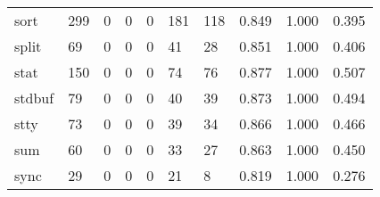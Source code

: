 \begin{longtable}{lp{1.3cm}p{1.3cm}p{1.3cm}p{1.3cm}p{1.3cm}p{1.3cm}p{1.3cm}p{1.3cm}p{1.3cm}}
sort      &                    299 &                                             0 &                                            0 &                                           0 &                                          181 &                                        118 &                                0.849 &                                  1.000 &                                0.395 \\
split     &                     69 &                                             0 &                                            0 &                                           0 &                                           41 &                                         28 &                                0.851 &                                  1.000 &                                0.406 \\
stat      &                    150 &                                             0 &                                            0 &                                           0 &                                           74 &                                         76 &                                0.877 &                                  1.000 &                                0.507 \\
stdbuf    &                     79 &                                             0 &                                            0 &                                           0 &                                           40 &                                         39 &                                0.873 &                                  1.000 &                                0.494 \\
stty      &                     73 &                                             0 &                                            0 &                                           0 &                                           39 &                                         34 &                                0.866 &                                  1.000 &                                0.466 \\
sum       &                     60 &                                             0 &                                            0 &                                           0 &                                           33 &                                         27 &                                0.863 &                                  1.000 &                                0.450 \\
sync      &                     29 &                                             0 &                                            0 &                                           0 &                                           21 &                                          8 &                                0.819 &                                  1.000 &                                0.276 \\

\end{longtable}
